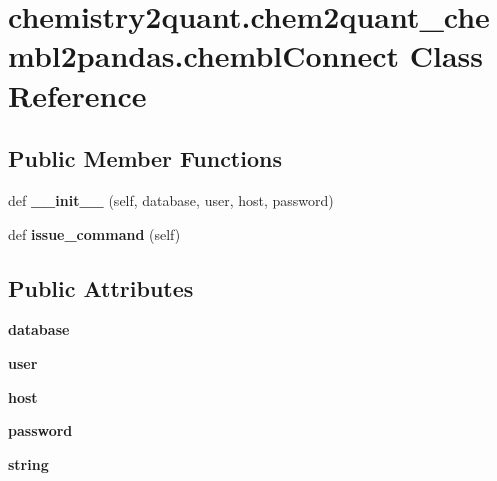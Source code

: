 \hypertarget{classchemistry2quant_1_1chem2quant__chembl2pandas_1_1chemblConnect}{}\section{chemistry2quant.\+chem2quant\+\_\+chembl2pandas.\+chembl\+Connect Class Reference}
\label{classchemistry2quant_1_1chem2quant__chembl2pandas_1_1chemblConnect}
\subsection*{Public Member Functions}
\begin{DoxyCompactItemize}
\item 
\mbox{\label{classchemistry2quant_1_1chem2quant__chembl2pandas_1_1chemblConnect_a46fd7779aad1ee0b8c4a31d3990eaf32}} 
def {\bfseries \+\_\+\+\_\+init\+\_\+\+\_\+} (self, database, user, host, password)
\item 
\mbox{\label{classchemistry2quant_1_1chem2quant__chembl2pandas_1_1chemblConnect_aac437bf7e56eae5d3d2ed990f669c195}} 
def {\bfseries issue\+\_\+command} (self)
\end{DoxyCompactItemize}
\subsection*{Public Attributes}
\begin{DoxyCompactItemize}
\item 
\mbox{\label{classchemistry2quant_1_1chem2quant__chembl2pandas_1_1chemblConnect_a7366b1ab44fca2518f70d63b5612b2f9}} 
{\bfseries database}
\item 
\mbox{\label{classchemistry2quant_1_1chem2quant__chembl2pandas_1_1chemblConnect_a5a15ec80604b37f133f41fd2ffd7eb81}} 
{\bfseries user}
\item 
\mbox{\label{classchemistry2quant_1_1chem2quant__chembl2pandas_1_1chemblConnect_ab9e42b86551f6f47d9946c6509f6296b}} 
{\bfseries host}
\item 
\mbox{\label{classchemistry2quant_1_1chem2quant__chembl2pandas_1_1chemblConnect_a3d8385099e5c6574f7b9da4befc8f659}} 
{\bfseries password}
\item 
\mbox{\label{classchemistry2quant_1_1chem2quant__chembl2pandas_1_1chemblConnect_a737c0c2ca11272795261f099ef2e6b1d}} 
{\bfseries string}
\end{DoxyCompactItemize}
